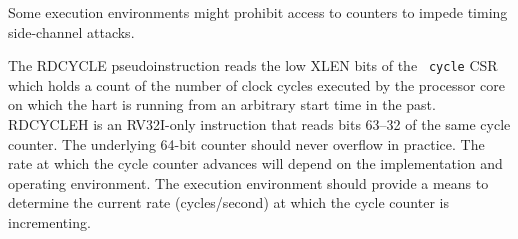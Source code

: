 \begin{commentary}
Some execution environments might prohibit access to counters to
impede timing side-channel attacks.
\end{commentary}

The RDCYCLE pseudoinstruction reads the low XLEN bits of the {\tt
  cycle} CSR which holds a count of the number of clock cycles
executed by the processor core on which the hart is running from
an arbitrary start time in the past.  RDCYCLEH is
an RV32I-only instruction that reads bits 63--32 of the same cycle
counter.  The underlying 64-bit counter should never overflow in
practice.  The rate at which the cycle counter advances will depend on
the implementation and operating environment.  The execution
environment should provide a means to determine the current rate
(cycles/second) at which the cycle counter is incrementing.

